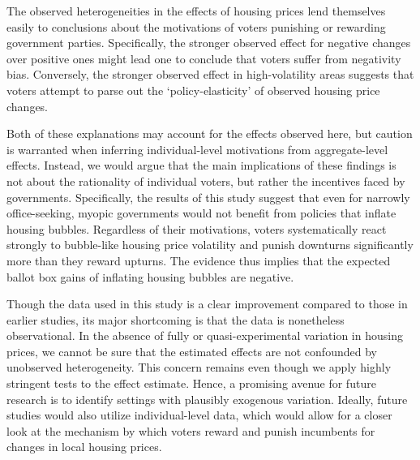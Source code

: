 \documentclass[12pt,a4paper]{article}
\begin{document}
The observed heterogeneities in the effects of housing prices lend themselves easily to conclusions about the motivations of voters punishing or rewarding government parties. Specifically, the stronger observed effect for negative changes over positive ones might lead one to conclude that voters suffer from negativity bias. Conversely, the stronger observed effect in high-volatility areas suggests that voters attempt to parse out the `policy-elasticity' of observed housing price changes. 

Both of these explanations may account for the effects observed here, but caution is warranted when inferring individual-level motivations from aggregate-level effects. Instead, we would argue that the main implications of these findings is not about the rationality of individual voters, but rather the incentives faced by governments. Specifically, the results of this study suggest that even for narrowly office-seeking, myopic governments would not benefit from policies that inflate housing bubbles. Regardless of their motivations, voters systematically react strongly to bubble-like housing price volatility and punish downturns significantly more than they reward upturns. The evidence thus implies that the expected ballot box gains of inflating housing bubbles are negative.

Though the data used in this study is a clear improvement compared to those in earlier studies, its major shortcoming is that the data is nonetheless observational. In the absence of fully or quasi-experimental variation in housing prices, we cannot be sure that the estimated effects are not confounded by unobserved heterogeneity. This concern remains even though we apply highly stringent tests to the effect estimate. Hence, a promising avenue for future research is to identify settings with plausibly exogenous variation. Ideally, future studies would also utilize individual-level data, which would allow for a closer look at the mechanism by which voters reward and punish incumbents for changes in local housing prices. 









\clearpage

\singlespacing



\end{document}
